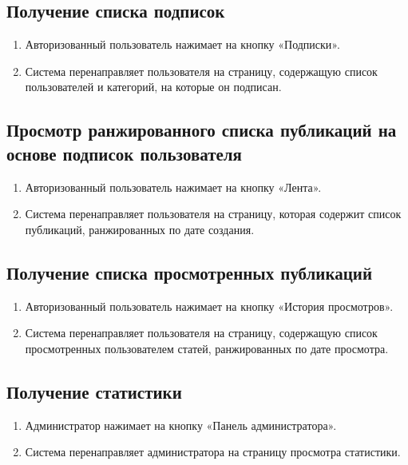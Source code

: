 \documentclass{bmstu-gost-7-32}
\begin{document}
\subsection*{Получение списка подписок}

\begin{enumerate}
	\item Авторизованный пользователь нажимает на кнопку «Подписки».
	\item Система перенаправляет пользователя на страницу, содержащую список пользователей и категорий, на которые он подписан.
\end{enumerate}

\subsection*{Просмотр ранжированного списка публикаций на основе подписок пользователя}

\begin{enumerate}
	\item Авторизованный пользователь нажимает на кнопку «Лента».
	\item Система перенаправляет пользователя на страницу, которая содержит список публикаций, ранжированных по дате создания.
\end{enumerate}

\subsection*{Получение списка просмотренных публикаций}

\begin{enumerate}
	\item Авторизованный пользователь нажимает на кнопку «История просмотров».
	\item Система перенаправляет пользователя на страницу, содержащую список просмотренных пользователем статей, ранжированных по дате просмотра.
\end{enumerate}

\subsection*{Получение статистики}

\begin{enumerate}
	\item Администратор нажимает на кнопку «Панель администратора».
	\item Система перенаправляет администратора на страницу просмотра статистики.
\end{enumerate}
\end{document}
